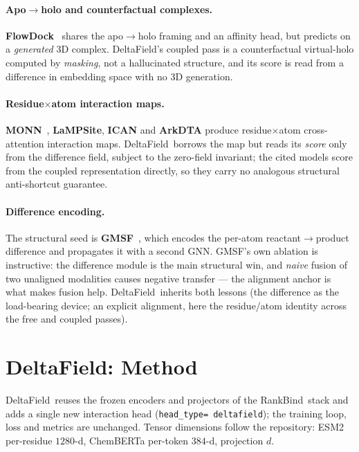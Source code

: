 \documentclass[11pt,a4paper]{article}
\newcommand{\df}{DeltaField\xspace}
\newcommand{\method}{RankBind\xspace}
\begin{document}
\paragraph{Apo$\to$holo and counterfactual complexes.}
\textbf{FlowDock}~\citep{morehead2025flowdock} shares the apo$\to$holo framing
and an affinity head, but predicts on a \emph{generated} 3D complex. \df's
coupled pass is a counterfactual virtual-holo computed by \emph{masking}, not
a hallucinated structure, and its score is read from a difference in
embedding space with no 3D generation.

\paragraph{Residue$\times$atom interaction maps.}
\textbf{MONN}~\citep{li2020monn}, \textbf{LaMPSite}, \textbf{ICAN} and
\textbf{ArkDTA} produce residue$\times$atom cross-attention interaction maps.
\df\ borrows the map but reads its \emph{score} only from the difference
field, subject to the zero-field invariant; the cited models score from the
coupled representation directly, so they carry no analogous structural
anti-shortcut guarantee.

\paragraph{Difference encoding.}
The structural seed is \textbf{GMSF}~\citep{zhao2026gmsf}, which encodes the
per-atom reactant$\to$product difference and propagates it with a second GNN.
GMSF's own ablation is instructive: the difference module is the main
structural win, and \emph{naive} fusion of two unaligned modalities causes
negative transfer --- the alignment anchor is what makes fusion help. \df\
inherits both lessons (the difference as the load-bearing device; an explicit
alignment, here the residue/atom identity across the free and coupled passes).

\section{\df: Method}
\label{sec:method}

\df\ reuses the frozen encoders and projectors of the \method\ stack and adds
a single new interaction head (\texttt{head\_type=\textquotesingle
deltafield\textquotesingle}); the training loop, loss and metrics are
unchanged. Tensor dimensions follow the repository: ESM2 per-residue
$1280$-d, ChemBERTa per-token $384$-d, projection $d$.
\end{document}
